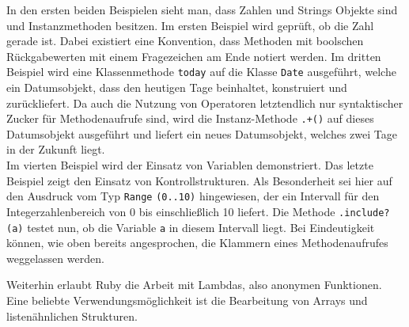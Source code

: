 In den ersten beiden Beispielen sieht man, dass Zahlen und Strings Objekte sind und Instanzmethoden besitzen. Im ersten Beispiel wird geprüft, ob die Zahl gerade ist. Dabei existiert eine Konvention, dass Methoden mit boolschen Rückgabewerten mit einem Fragezeichen am Ende notiert werden. Im dritten Beispiel wird eine Klassenmethode \texttt{today} auf die Klasse \texttt{Date} ausgeführt, welche ein Datumsobjekt, dass den heutigen Tage beinhaltet, konstruiert und zurückliefert. Da auch die Nutzung von Operatoren letztendlich nur syntaktischer Zucker für Methodenaufrufe sind, wird die Instanz-Methode \texttt{.+()} auf dieses Datumsobjekt ausgeführt und liefert ein neues Datumsobjekt, welches zwei Tage in der Zukunft liegt.\\
Im vierten Beispiel wird der Einsatz von Variablen demonstriert.
Das letzte Beispiel zeigt den Einsatz von Kontrollstrukturen. Als Besonderheit sei hier auf den Ausdruck vom Typ \texttt{Range} \texttt{(0..10)} hingewiesen, der ein Intervall für den Integerzahlenbereich von 0 bis einschließlich 10 liefert. Die Methode \texttt{.include?(a)} testet nun, ob die Variable \texttt{a} in diesem Intervall liegt. Bei Eindeutigkeit können, wie oben bereits angesprochen, die Klammern eines Methodenaufrufes weggelassen werden.

Weiterhin erlaubt Ruby die Arbeit mit Lambdas, also anonymen Funktionen. Eine beliebte Verwendungsmöglichkeit ist die Bearbeitung von Arrays und listenähnlichen Strukturen.

%
%
%
%

